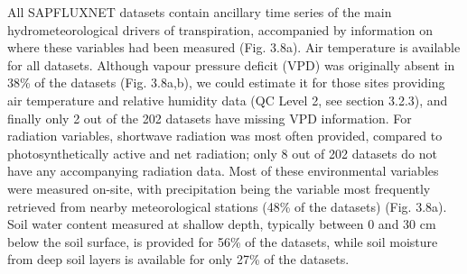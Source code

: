 \documentclass[11pt,twoside]{reedthesis}
\begin{document}
All SAPFLUXNET datasets contain ancillary time series of the main
hydrometeorological drivers of transpiration, accompanied by information
on where these variables had been measured (Fig. 3.8a). Air temperature
is available for all datasets. Although vapour pressure deficit (VPD)
was originally absent in 38\% of the datasets (Fig. 3.8a,b), we could
estimate it for those sites providing air temperature and relative
humidity data (QC Level 2, see section 3.2.3), and finally only 2 out of
the 202 datasets have missing VPD information. For radiation variables,
shortwave radiation was most often provided, compared to
photosynthetically active and net radiation; only 8 out of 202 datasets
do not have any accompanying radiation data. Most of these environmental
variables were measured on-site, with precipitation being the variable
most frequently retrieved from nearby meteorological stations (48\% of
the datasets) (Fig. 3.8a). Soil water content measured at shallow depth,
typically between 0 and 30 cm below the soil surface, is provided for
56\% of the datasets, while soil moisture from deep soil layers is
available for only 27\% of the datasets.\par
\end{document}
